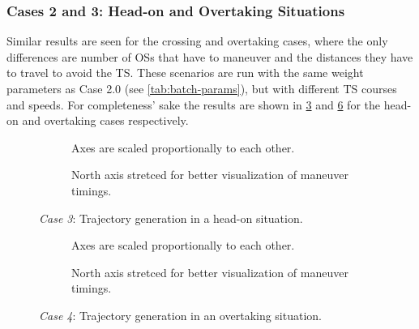 \subsubsection{Cases 2 and 3: Head-on and Overtaking Situations}
Similar results are seen for the crossing and overtaking cases, where the only differences are number of OSs that have to maneuver and the distances they have to travel to avoid the TS. These scenarios are run with the same weight parameters as Case 2.0 (see \cref{tab:batch-params}), but with different TS courses and speeds. For completeness' sake the results are shown in \cref{fig:head-on} and \cref{fig:overtaking} for the head-on and overtaking cases respectively. 






\begin{figure}[htbp]
    \centering
    \begin{subfigure}[b]{\textwidth}
        \centering
        
        \caption{Axes are scaled proportionally to each other.}
        \label{fig:head-on-scenario-a}
    \end{subfigure}
    \begin{subfigure}[b]{\textwidth}
        \centering
        
        \caption{North axis stretced for better visualization of maneuver timings.}
        \label{fig:head-on-scenario-b}
    \end{subfigure}
    \caption{\emph{Case 3}: Trajectory generation in a head-on situation.}
    \label{fig:head-on}
\end{figure}




\begin{figure}[htbp]
    \centering
    \begin{subfigure}[b]{\textwidth}
        
        \caption{Axes are scaled proportionally to each other.}
        \label{fig:overtaking-scenario-a}
    \end{subfigure}
    \begin{subfigure}[b]{\textwidth}
        
        \caption{North axis stretced for better visualization of maneuver timings.}
        \label{fig:overtaking-scenario-b}
    \end{subfigure}
    \caption{\emph{Case 4}: Trajectory generation in an overtaking situation.}
    \label{fig:overtaking}
\end{figure}




